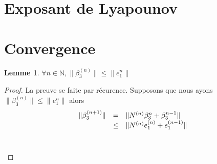 \documentclass[12pt]{article}
\theoremstyle{plain}%
\newtheorem{lem}[thm]{Lemme}
\theoremstyle{definition}
\theoremstyle{remark}
\begin{document}
\section{Exposant de Lyapounov}

\section{Convergence}
\begin{lem}
$\forall n \in \mathbb{N}, \|\beta_3^{(n)}\| \leq \|e_1^{n}\|$
\end{lem}
\begin{proof}
La preuve se faite par récurence. Supposons que nous ayons $\|\beta_3^{(n)}\| \leq \|e_1^{n}\|$ alors \newline
\[
\begin{array}{c c l}
\| \beta_3^{(n+1)} \|& = & \|N^{(n)}\beta_3^{n} + \beta_3^{n-1}\| \\
& \leq & \|N^{(n)}e_1^{(n)}+e_1^{(n-1)} \| \\
& & \\
&  &
\end{array}
\]
\end{proof}
\end{document}
